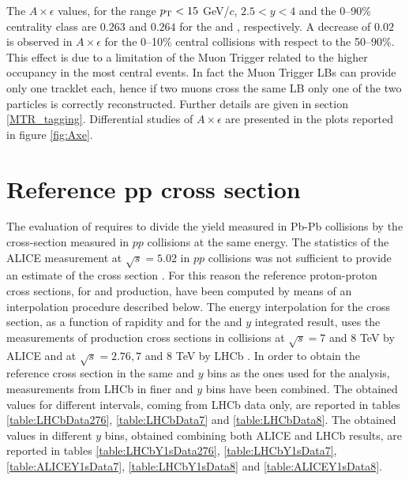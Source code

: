 The $A\times\epsilon$ values, for the range $p_{\rm T} < 15$ GeV/$c$, $2.5 < y < 4$ and the 0--90\% centrality class are $0.263$ and $0.264$ for the \upsis and \upsiss, respectively. 
A decrease of $0.02$ is observed in  $A\times\epsilon$ for the 0--10\% central collisions with respect to the 50--90\%. 
This effect is due to a limitation of the Muon Trigger related to the higher occupancy in the most central events.
In fact the Muon Trigger LBs can provide only one tracklet each, hence if two muons cross the same LB only one of the two particles is correctly reconstructed.
Further details are given in section \ref{MTR_tagging}.
Differential studies of $A\times\epsilon$ are presented in the plots reported in figure \ref{fig:Axe}.

\section{Reference pp cross section}
\label{sec:ppxsection}
The evaluation of \raa requires to divide the yield measured in Pb-Pb collisions by the cross-section measured in $pp$ collisions at the same energy.
The statistics of the ALICE measurement at $\sqrt{s}=5.02$ in $pp$ collisions was not sufficient to provide an estimate of the \upsi cross section \cite{Adam:2016rdg}.
For this reason the reference proton-proton cross sections, for \upsis and \upsiss production, have been computed by means of an interpolation procedure described below.
The energy interpolation for the \upsi cross section, as a function of rapidity and for the \pt and $y$ integrated result, uses the measurements of \upsi production cross sections in \pp collisions at $\sqrt{s}=7$ and $8$ \rm{TeV} by ALICE \cite{Abelev:2014qha,Adam:2015rta} and at $\sqrt{s}=2.76, 7$ and $8$ \rm{TeV} by LHCb \cite{Aaij:2014nwa,Aaij:2015awa}. 
In order to obtain the reference cross section in the same \pt and $y$ bins as the ones used for the analysis, measurements from LHCb in finer \pt and $y$ bins have been combined.
The obtained values for different \pt intervals, coming from LHCb data only, are reported in tables \ref{table:LHCbData276}, \ref{table:LHCbData7} and \ref{table:LHCbData8}.
The obtained values in different $y$ bins, obtained combining both ALICE and LHCb results, are reported in tables \ref{table:LHCbY1sData276}, \ref{table:LHCbY1sData7}, \ref{table:ALICEY1sData7}, \ref{table:LHCbY1sData8} and \ref{table:ALICEY1sData8}.

